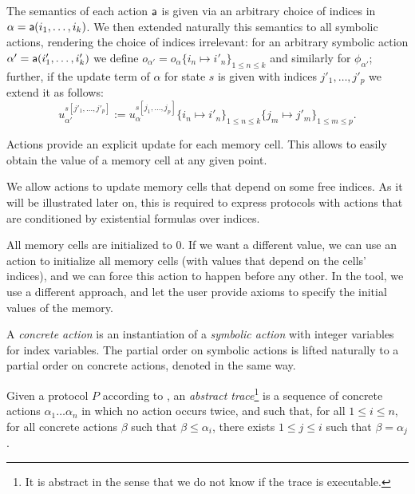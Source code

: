The semantics of each action $\textsf{a}$ is given via an arbitrary
choice of indices in $\alpha = \textsf{a}(i_1,\ldots,i_k)$.
We then extended naturally this semantics to all symbolic actions,
rendering the choice of indices irrelevant:
for an arbitrary symbolic action $\alpha' =
\textsf{a}(i'_1,\ldots,i'_k)$ we define
$o_{\alpha'} = o_\alpha\{i_n\mapsto i'_n\}_{1\leq n \leq k}$
and similarly for $\phi_{\alpha'}$;
further, if the update term of $\alpha$ for state $s$ is given
with indices $j'_1,\ldots,j'_p$ we extend it as follows:
$$ u_{\alpha'}^{s[j'_1,\ldots,j'_p]} :=
   u_\alpha^{s[j_1,\ldots,j_p]}\{i_n\mapsto i'_n\}_{1 \leq n \leq k}
                                \{j_m\mapsto j'_m\}_{1 \leq m \leq p}.$$

\begin{remark}
  Actions provide an explicit update for each memory cell. This
  allows to easily obtain the value of a memory cell at any given point.

  We allow actions to update memory cells that depend on some free indices.  As
  it will be illustrated later on, this is required to express protocols with
  actions that are conditioned by existential formulas over indices.

  All memory cells are initialized to $0$. If we want a different value, we can use an action to initialize all memory cells (with values that depend on the cells'
  indices), and we can force this action to happen before any other.
  In the tool, we use a different approach, and let the user provide axioms to specify the initial values of the memory.
\end{remark}

\begin{definition}
  A \emph{concrete action} is an instantiation of a \emph{symbolic action}
  with integer variables for index variables. The partial order on symbolic
  actions is lifted naturally to a partial order on concrete actions, denoted
  in the same way.
\end{definition}

\begin{definition}
  \label{def:trace}
  Given a protocol $P$ according to ,
  an \emph{abstract trace}\footnote{
    It is abstract in the sense that we do not know if the trace
    is executable.} is a sequence of concrete actions
  $\alpha_1 \dots \alpha_n$
  in which no action occurs twice, and such that,
  for all $1 \leq i \leq n$,
  for all concrete actions $\beta$ such that $\beta \leq \alpha_i$,
  there exists $1 \leq j \leq i$ such that $\beta = \alpha_j$.
\end{definition}


